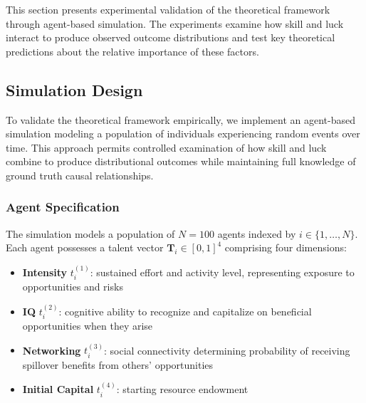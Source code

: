 
This section presents experimental validation of the theoretical framework
through agent-based simulation. The experiments examine how skill and
luck interact to produce observed outcome distributions and test key
theoretical predictions about the relative importance of these factors.

\subsection{Simulation Design}

To validate the theoretical framework empirically, we implement an agent-based
simulation modeling a population of individuals experiencing random
events over time. This approach permits controlled examination of how skill
and luck combine to produce distributional outcomes while maintaining full
knowledge of ground truth causal relationships.

\subsubsection{Agent Specification}

The simulation models a population of $N = 100$ agents indexed by
$i \in \{1, \ldots, N\}$. Each agent possesses a talent vector $\mathbf{T}
_{i} \in [0,1]^{4}$ comprising four dimensions:

\begin{itemize}
  \item \textbf{Intensity} $t_{i}^{(1)}$: sustained effort and activity level,
    representing exposure to opportunities and risks

  \item \textbf{IQ} $t_{i}^{(2)}$: cognitive ability to recognize and capitalize
    on beneficial opportunities when they arise

  \item \textbf{Networking} $t_{i}^{(3)}$: social connectivity determining
    probability of receiving spillover benefits from others'
    opportunities

  \item \textbf{Initial Capital} $t_{i}^{(4)}$: starting resource endowment
\end{itemize}

